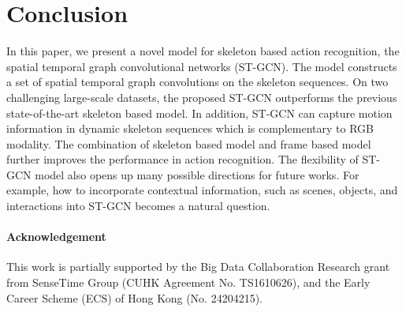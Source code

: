 \documentclass[letterpaper]{article} \usepackage{aaai18}  \usepackage{times}  \usepackage{helvet}  \usepackage{courier}  \usepackage{url}  \usepackage{graphicx}
\begin{document}
\section{Conclusion}
In this paper, we present a novel model for skeleton based action recognition, the spatial temporal graph convolutional networks (ST-GCN).
The model constructs a set of spatial temporal graph convolutions on the skeleton sequences.
On two challenging large-scale datasets, the proposed ST-GCN outperforms the previous state-of-the-art skeleton based model. 
In addition, ST-GCN can capture motion information in dynamic skeleton sequences which is complementary to RGB modality. The combination of skeleton based model and frame based model further improves the performance in action recognition.
The flexibility of ST-GCN model also opens up many possible directions for future works. 
For example, how to incorporate contextual information, such as scenes, objects, and interactions into ST-GCN becomes a natural question. 

\paragraph{Acknowledgement} This work is partially supported by the Big Data Collaboration Research grant from SenseTime Group (CUHK Agreement No. TS1610626), and the Early Career Scheme (ECS) of Hong Kong (No. 24204215).




{
	
	
}
\end{document}

